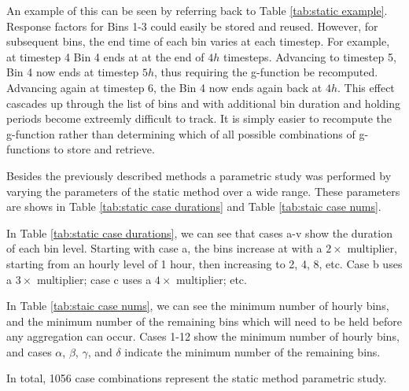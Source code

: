 \documentclass[review,12pt]{elsarticle}
\begin{document}
An example of this can be seen by referring back to Table \ref{tab:static example}. Response factors for Bins 1-3 could easily be stored and reused. However, for subsequent bins, the end time of each bin varies at each timestep. For example, at timestep 4 Bin 4 ends at at the end of $4h$ timesteps. Advancing to timestep 5, Bin 4 now ends at timestep $5h$, thus requiring the g-function be recomputed. Advancing again at timestep 6, the Bin 4 now ends again back at $4h$. This effect cascades up through the list of bins and with additional bin duration and holding periods become extreemly difficult to track. It is simply easier to recompute the g-function rather than determining which of all possible combinations of g-functions to store and retrieve.

Besides the previously described methods \citep{YavuzturkSpitler1999, BernierPinelLabibPaillot2004, Liu2005} a parametric study was performed by varying the parameters of the static method over a wide range. These parameters are shows in Table \ref{tab:static case durations} and Table \ref{tab:staic case nums}. 

In Table \ref{tab:static case durations}, we can see that cases a-v show the duration of each bin level. Starting with case a, the bins increase at with a $2\times$ multiplier, starting from an hourly level of 1 hour, then increasing to 2, 4, 8, etc. Case b uses a $3\times$ multiplier; case c uses a $4\times$ multiplier; etc.

In Table \ref{tab:staic case nums}, we can see the minimum number of hourly bins, and the minimum number of the remaining bins which will need to be held before any aggregation can occur. Cases 1-12 show the minimum number of hourly bins, and cases $\alpha$, $\beta$, $\gamma$, and $\delta$ indicate the minimum number of the remaining bins.

In total, 1056 case combinations represent the static method parametric study.
\end{document}
